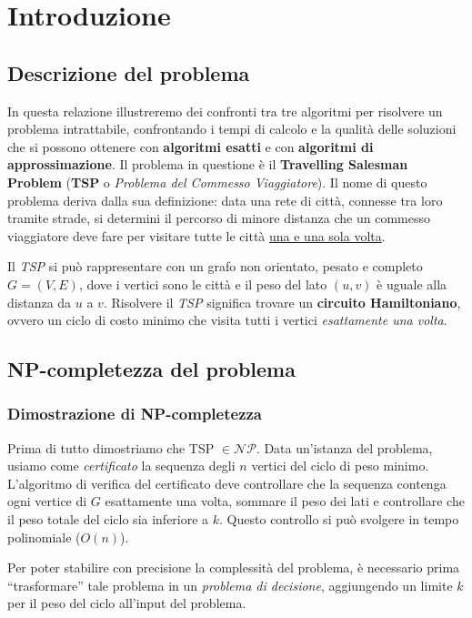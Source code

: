 \section{Introduzione}

\subsection{Descrizione del problema}

In questa relazione illustreremo dei confronti tra tre algoritmi per risolvere un problema
intrattabile, confrontando i tempi di calcolo e la qualità delle soluzioni
che si possono ottenere con \textbf{algoritmi esatti} e con \textbf{algoritmi di approssimazione}.
Il problema in questione è il \textbf{Travelling Salesman Problem} (\textbf{TSP} o
\textit{Problema del Commesso Viaggiatore}). Il nome di questo problema deriva dalla sua
definizione: data una rete di città, connesse tra loro tramite strade, si determini il
percorso di minore distanza che un commesso viaggiatore deve fare per visitare tutte le città
\underline{una e una sola volta}.

Il \textit{TSP} si può rappresentare con un grafo non orientato, pesato e
completo $G = (V,E)$, dove i vertici sono le città e il peso del lato $(u,v)$
è uguale alla distanza da $u$ a $v$. Risolvere il \textit{TSP} significa trovare un
\textbf{circuito Hamiltoniano}, ovvero un ciclo di costo minimo che visita tutti
i vertici \textit{esattamente una volta}.

\subsection{NP-completezza del problema}

\subsubsection{Dimostrazione di NP-completezza}

Prima di tutto dimostriamo che TSP $\in \mathcal{NP}$. Data un'istanza del problema, usiamo
come \textit{certificato} la sequenza degli $n$ vertici del ciclo di peso minimo.
L'algoritmo di verifica del certificato deve controllare che la sequenza contenga ogni
vertice di $G$ esattamente una volta, sommare il peso dei lati e controllare che il peso
totale del ciclo sia inferiore a $k$. Questo controllo si può svolgere in tempo polinomiale
($O(n)$).

Per poter stabilire con precisione la complessità del problema, è necessario prima
“trasformare” tale problema in un \textit{problema di decisione}, aggiungendo un limite $k$
per il peso del ciclo all'input del problema.

